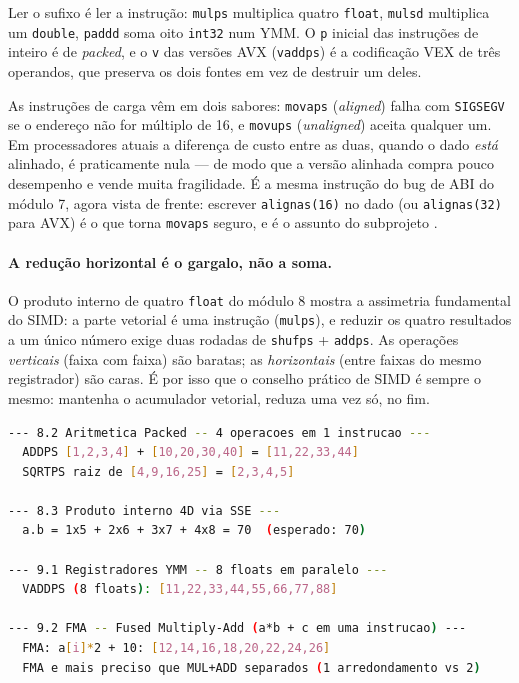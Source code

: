 Ler o sufixo é ler a instrução: \texttt{mulps} multiplica quatro
\texttt{float}, \texttt{mulsd} multiplica um \texttt{double}, \texttt{paddd}
soma oito \texttt{int32} num YMM. O \texttt{p} inicial das instruções de
inteiro é de \emph{packed}, e o \texttt{v} das versões AVX
(\texttt{vaddps}) é a codificação VEX de três operandos, que preserva os dois
fontes em vez de destruir um deles.

\begin{armadilha}
As instruções de carga vêm em dois sabores: \texttt{movaps} (\emph{aligned})
falha com \texttt{SIGSEGV} se o endereço não for múltiplo de 16, e
\texttt{movups} (\emph{unaligned}) aceita qualquer um. Em processadores atuais
a diferença de custo entre as duas, quando o dado \emph{está} alinhado, é
praticamente nula --- de modo que a versão alinhada compra pouco desempenho e
vende muita fragilidade. É a mesma instrução do bug de ABI do módulo 7, agora
vista de frente: escrever \texttt{alignas(16)} no dado (ou \texttt{alignas(32)}
para AVX) é o que torna \texttt{movaps} seguro, e é o assunto do subprojeto
.
\end{armadilha}

\paragraph{A redução horizontal é o gargalo, não a soma.} O produto interno de
quatro \texttt{float} do módulo 8 mostra a assimetria fundamental do SIMD: a
parte vetorial é uma instrução (\texttt{mulps}), e reduzir os quatro resultados
a um único número exige duas rodadas de \texttt{shufps} + \texttt{addps}. As
operações \emph{verticais} (faixa com faixa) são baratas; as \emph{horizontais}
(entre faixas do mesmo registrador) são caras. É por isso que o conselho
prático de SIMD é sempre o mesmo: mantenha o acumulador vetorial, reduza uma
vez só, no fim.

\begin{lstlisting}[style=bt, language=bash,
    caption={Saída medida de \texttt{dist/bin/asm\_08\_simd\_sse} e
             \texttt{dist/bin/asm\_09\_simd\_avx}.}]
--- 8.2 Aritmetica Packed -- 4 operacoes em 1 instrucao ---
  ADDPS [1,2,3,4] + [10,20,30,40] = [11,22,33,44]
  SQRTPS raiz de [4,9,16,25] = [2,3,4,5]

--- 8.3 Produto interno 4D via SSE ---
  a.b = 1x5 + 2x6 + 3x7 + 4x8 = 70  (esperado: 70)

--- 9.1 Registradores YMM -- 8 floats em paralelo ---
  VADDPS (8 floats): [11,22,33,44,55,66,77,88]

--- 9.2 FMA -- Fused Multiply-Add (a*b + c em uma instrucao) ---
  FMA: a[i]*2 + 10: [12,14,16,18,20,22,24,26]
  FMA e mais preciso que MUL+ADD separados (1 arredondamento vs 2)
\end{lstlisting}

